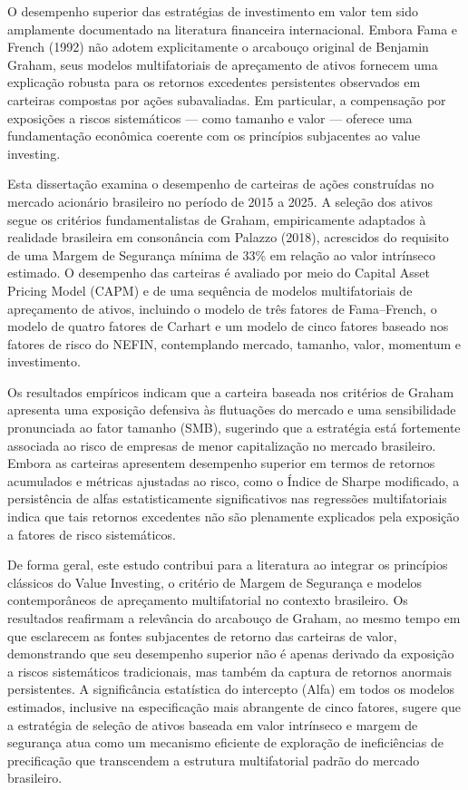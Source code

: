 \begin{meuresumo}
O desempenho superior das estratégias de investimento em valor tem sido amplamente documentado na literatura financeira internacional. Embora Fama e French (1992) não adotem explicitamente o arcabouço original de Benjamin Graham, seus modelos multifatoriais de apreçamento de ativos fornecem uma explicação robusta para os retornos excedentes persistentes observados em carteiras compostas por ações subavaliadas. Em particular, a compensação por exposições a riscos sistemáticos — como tamanho e valor — oferece uma fundamentação econômica coerente com os princípios subjacentes ao value investing.

Esta dissertação examina o desempenho de carteiras de ações construídas no mercado acionário brasileiro no período de 2015 a 2025. A seleção dos ativos segue os critérios fundamentalistas de Graham, empiricamente adaptados à realidade brasileira em consonância com Palazzo (2018), acrescidos do requisito de uma Margem de Segurança mínima de 33\% em relação ao valor intrínseco estimado. O desempenho das carteiras é avaliado por meio do Capital Asset Pricing Model (CAPM) e de uma sequência de modelos multifatoriais de apreçamento de ativos, incluindo o modelo de três fatores de Fama–French, o modelo de quatro fatores de Carhart e um modelo de cinco fatores baseado nos fatores de risco do NEFIN, contemplando mercado, tamanho, valor, momentum e investimento.

Os resultados empíricos indicam que a carteira baseada nos critérios de Graham apresenta uma exposição defensiva às flutuações do mercado e uma sensibilidade pronunciada ao fator tamanho (SMB), sugerindo que a estratégia está fortemente associada ao risco de empresas de menor capitalização no mercado brasileiro. Embora as carteiras apresentem desempenho superior em termos de retornos acumulados e métricas ajustadas ao risco, como o Índice de Sharpe modificado, a persistência de alfas estatisticamente significativos nas regressões multifatoriais indica que tais retornos excedentes não são plenamente explicados pela exposição a fatores de risco sistemáticos.

De forma geral, este estudo contribui para a literatura ao integrar os princípios clássicos do Value Investing, o critério de Margem de Segurança e modelos contemporâneos de apreçamento multifatorial no contexto brasileiro. Os resultados reafirmam a relevância do arcabouço de Graham, ao mesmo tempo em que esclarecem as fontes subjacentes de retorno das carteiras de valor, demonstrando que seu desempenho superior não é apenas derivado da exposição a riscos sistemáticos tradicionais, mas também da captura de retornos anormais persistentes. A significância estatística do intercepto (Alfa) em todos os modelos estimados, inclusive na especificação mais abrangente de cinco fatores, sugere que a estratégia de seleção de ativos baseada em valor intrínseco e margem de segurança atua como um mecanismo eficiente de exploração de ineficiências de precificação que transcendem a estrutura multifatorial padrão do mercado brasileiro.
\end{meuresumo}




\makeatletter
\def\@makechapterhead#1{%
  \vspace*{50\p@}%
  {\parindent \z@ \raggedright \normalfont
    \ifnum \c@secnumdepth >\m@ne
      \huge\bfseries \thechapter\space
    \fi
    \huge \bfseries #1\par\nobreak
    \vskip 40\p@
  }}
\makeatother


